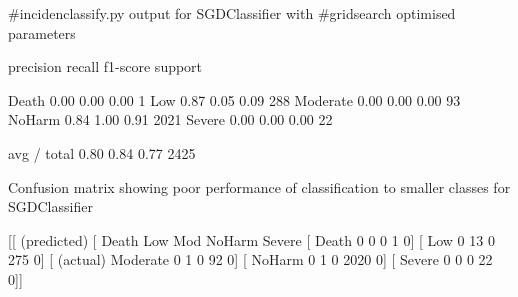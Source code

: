 \begin{pyverbatim}
#incidenclassify.py output for SGDClassifier with
#gridsearch optimised parameters

 
             precision    recall  f1-score   support

      Death       0.00      0.00      0.00         1
        Low       0.87      0.05      0.09       288
   Moderate       0.00      0.00      0.00        93
     NoHarm       0.84      1.00      0.91      2021
     Severe       0.00      0.00      0.00        22

avg / total       0.80      0.84      0.77      2425

Confusion matrix showing poor performance of 
classification to smaller classes for SGDClassifier

[[                        (predicted)
 [                 Death Low  Mod NoHarm Severe
 [           Death    0    0    0    1    0]
 [           Low      0   13    0  275    0]
 [ (actual)  Moderate 0    1    0   92    0]
 [           NoHarm   0    1    0 2020    0]
 [           Severe   0    0    0   22    0]]


\end{pyverbatim}


